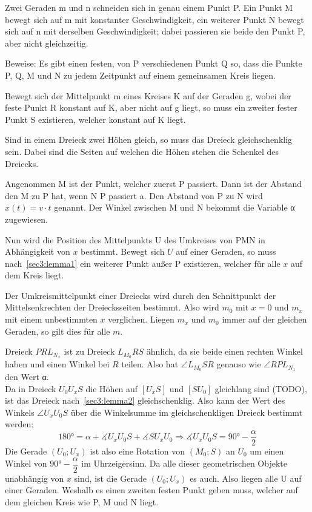 \documentclass[10pt, a4paper]{amsart}
\makeatletter
\renewenvironment{proof}[1][\proofname]{\par
\pushQED{\qed}%
\normalfont \topsep6\p@\@plus6\p@\relax
\trivlist
\item\relax
{\bfseries#1}\hspace\labelsep\ignorespaces
}{%
\popQED\endtrivlist\@endpefalse
}
\newenvironment{proof thm}[1]{
\begin{proof}[\proofname~(#1)]}{\end{proof}}
\makeatother
\begin{document}
\newpage
\begin{aufgabe}
  Zwei Geraden m und n schneiden sich in genau einem Punkt P. Ein Punkt M bewegt
  sich auf m mit konstanter Geschwindigkeit, ein weiterer Punkt N bewegt sich
  auf n mit derselben Geschwindigkeit; dabei passieren sie beide den Punkt P,
  aber nicht gleichzeitig.
 
  Beweise: Es gibt einen festen, von P verschiedenen Punkt Q so, dass die Punkte
  P, Q, M und N zu jedem Zeitpunkt auf einem gemeinsamen Kreis liegen.\\
\end{aufgabe}
\begin{lemma}\label{sec3:lemma1}
  Bewegt sich der Mittelpunkt m eines Kreises K auf der Geraden g, wobei der
  feste Punkt R konstant auf K, aber nicht auf g liegt, so muss ein zweiter
  fester Punkt S existieren, welcher konstant auf K liegt.
\end{lemma}
\begin{lemma}\label{sec3:lemma2}
  Sind in einem Dreieck zwei Höhen gleich, so muss das Dreieck gleichschenklig
  sein. Dabei sind die Seiten auf welchen die Höhen stehen die Schenkel des
  Dreiecks.
\end{lemma}
\begin{proof}
  Angenommen M ist der Punkt, welcher zuerst P passiert. Dann ist der Abstand
  den M zu P hat, wenn N P passiert a. Den Abstand von P zu N wird
  $x(t)=v\cdot{}t$ genannt. Der Winkel zwischen M und N bekommt die Variable α
  zugewiesen.

  Nun wird die Position des Mittelpunkts U des Umkreises von PMN in Abhängigkeit
  von $x$ bestimmt. Bewegt sich $U$ auf einer Geraden, so muss
  nach~\autoref{sec3:lemma1} ein weiterer Punkt außer P existieren, welcher für
  alle $x$ auf dem Kreis liegt.

  Der Umkreismittelpunkt einer Dreiecks wird durch den Schnittpunkt der
  Mittelsenkrechten der Dreiecksseiten bestimmt. Also wird $m_0$ mit $x=0$ und
  $m_x$ mit einem unbestimmten $x$ verglichen. Liegen $m_x$ und $m_0$ immer auf
  der gleichen Geraden, so gilt dies für alle $m$.


  Dreieck $PRL_{N_{x}}$ ist zu Dreieck $L_{M_0}RS$ ähnlich, da sie beide einen
  rechten Winkel haben und einen Winkel bei $R$ teilen. Also hat $\angle
  L_{M_0}SR$ genauso wie $\angle RPL_{N_x}$ den Wert α.\\
  Da in Dreieck $U_0U_xS$ die Höhen auf $[U_xS]$ und $[SU_0]$ gleichlang sind
  (TODO), ist das Dreieck nach~\autoref{sec3:lemma2} gleichschenklig. Also kann
  der Wert des Winkels $\angle U_xU_0S$ über die Winkelsumme im
  gleichschenkligen Dreieck bestimmt werden:
  \[180° = α + \measuredangle U_xU_0S + \measuredangle SU_xU_0 \Rightarrow
    \measuredangle U_xU_0S = 90°-\dfrac{α}{2} \] Die Gerade $(U_0;U_x)$ ist also
  eine Rotation von $(M_0;S)$ an $U_0$ um einen Winkel von $90°-\dfrac{α}{2}$ im
  Uhrzeigersinn. Da alle dieser geometrischen Objekte unabhängig von $x$ sind,
  ist die Gerade $(U_0;U_x)$ es auch. Also liegen alle U auf einer Geraden.
  Weshalb es einen zweiten festen Punkt geben muss, welcher auf dem gleichen
  Kreis wie P, M und N liegt.
\end{proof}
\end{document}
